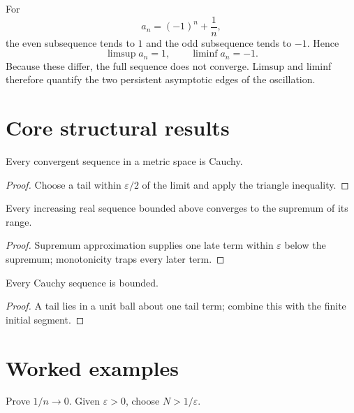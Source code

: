 \begin{example}\label{ex:ii03-expand-03}
For
\[
a_n=(-1)^n+\frac1n,
\]
the even subsequence tends to \(1\) and the odd subsequence tends to \(-1\).
Hence
\[
\limsup a_n=1,\qquad \liminf a_n=-1.
\]
Because these differ, the full sequence does not converge. Limsup and liminf
therefore quantify the two persistent asymptotic edges of the oscillation.
\end{example}
\section{Core structural results}

\begin{theorem}\label{thm:ii03-01}
Every convergent sequence in a metric space is Cauchy.
\begin{proof}
Choose a tail within $\varepsilon/2$ of the limit and apply the triangle inequality.
\end{proof}
\end{theorem}

\begin{theorem}\label{thm:ii03-02}
Every increasing real sequence bounded above converges to the supremum of its range.
\begin{proof}
Supremum approximation supplies one late term within $\varepsilon$ below the supremum; monotonicity traps every later term.
\end{proof}
\end{theorem}

\begin{theorem}\label{thm:ii03-03}
Every Cauchy sequence is bounded.
\begin{proof}
A tail lies in a unit ball about one tail term; combine this with the finite initial segment.
\end{proof}
\end{theorem}

\section{Worked examples}

\begin{example}\label{ex:ii03-worked-01}
Prove $1/n\to0$. Given $\varepsilon>0$, choose $N>1/\varepsilon$.
\end{example}

